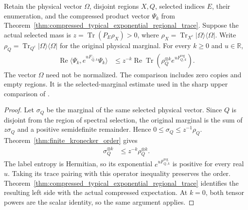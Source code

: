 \begin{theorem}
    \label{thm:compressed_typical_exponential_domination}
    \leanok
    Retain the physical vector $\Omega$, disjoint regions $X,Q$, selected
    indices $E$, their enumeration, and the compressed product vector
    $\Psi_k$ from Theorem~\ref{thm:compressed_typical_exponential_regional_trace}.
    Suppose the actual selected mass is
    $z=\operatorname{Tr}(P_E\rho_X)>0$, where
    $\rho_X=\operatorname{Tr}_{X^c}|\Omega\rangle\langle\Omega|$.
    Write $\rho_Q=\operatorname{Tr}_{Q^c}|\Omega\rangle\langle\Omega|$
    for the original physical marginal. For every $k\ge0$ and
    $u\in\mathbb R$,
    \begin{align}
        \operatorname{Re}\langle\Psi_k,e^{uF_{\widehat Q,k}}\Psi_k\rangle
         & \le z^{-k}\operatorname{Re}\operatorname{Tr}\!\left(
        \rho_Q^{\otimes k}e^{uF^{\mathrm{reg}}_{Q,k}}\right).
    \end{align}
    The vector $\Omega$ need not be normalized. The comparison includes
    zero copies and empty regions. It is the selected-marginal estimate
    used in the sharp upper comparison of \cite[Section~8]{OpenAI2026AreaLaw}.
\end{theorem}
\begin{proof}
    \leanok
    Let $\sigma_Q$ be the marginal of the same selected physical vector.
    Since $Q$ is disjoint from the region of spectral selection, the
    original marginal is the sum of $z\sigma_Q$ and a positive
    semidefinite remainder. Hence $0\le\sigma_Q\le z^{-1}\rho_Q$.
    Theorem~\ref{thm:finite_kronecker_order} gives
    \begin{align}
        \sigma_Q^{\otimes k} & \le z^{-k}\rho_Q^{\otimes k}.
    \end{align}
    The label entropy is Hermitian, so its exponential
    $e^{uF^{\mathrm{reg}}_{Q,k}}$ is positive for every real $u$.
    Taking its trace pairing with this operator inequality preserves
    the order. Theorem~\ref{thm:compressed_typical_exponential_regional_trace}
    identifies the resulting left side with the actual compressed
    expectation. At $k=0$, both tensor powers are the scalar identity,
    so the same argument applies.
\end{proof}

